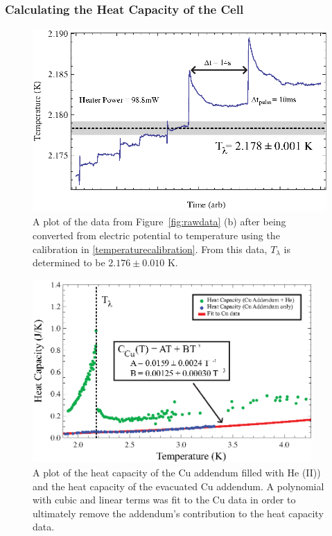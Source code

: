 \subsubsection{Calculating the Heat Capacity of the Cell}\label{calculatingtheheatcapacityofthecell}

\begin{figure}[htbp]
\begin{center}
\includegraphics[height=70mm]{./figures/heatingdata.eps}
\caption{\small{A plot of the data from Figure~\ref{fig:rawdata} (b) after being converted from electric potential to temperature using the calibration in \ref{temperaturecalibration}.  From this data, $T_{\lambda}$ is determined to be $2.176\pm0.010$ K.}}
\label{fig:heatingdata}
\end{center}
\end{figure}

\begin{figure}[htbp]
\begin{center}
\includegraphics[height=70mm]{./figures/lambdanorm.eps}
\caption{\small{A plot of the heat capacity of the Cu addendum filled with He (II)) and the heat capacity of the evacuated Cu addendum.  A polynomial with cubic and linear terms was fit to the Cu data in order to ultimately remove the addendum's contribution to the heat capacity data.}}
\label{fig:lambdanorm}
\end{center}
\end{figure}

